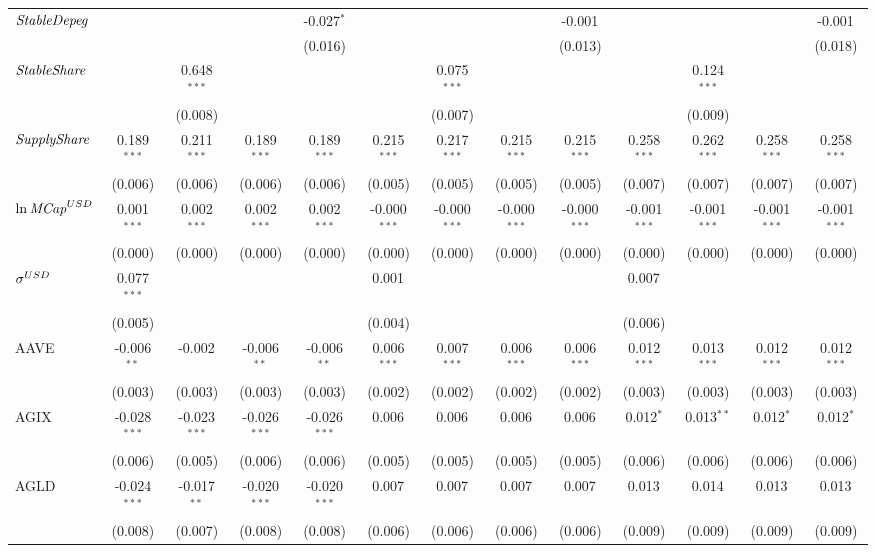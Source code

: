 \begin{table}[!htbp]
\begin{tabular}{@{\extracolsep{5pt}}lcccccccccccc}
 ${\it StableDepeg}$ & & & & -0.027$^{*}$ & & & & -0.001$^{}$ & & & & -0.001$^{}$ \\
  & & & & (0.016) & & & & (0.013) & & & & (0.018) \\
 ${\it StableShare}$ & & 0.648$^{***}$ & & & & 0.075$^{***}$ & & & & 0.124$^{***}$ & & \\
  & & (0.008) & & & & (0.007) & & & & (0.009) & & \\
 ${\it SupplyShare}$ & 0.189$^{***}$ & 0.211$^{***}$ & 0.189$^{***}$ & 0.189$^{***}$ & 0.215$^{***}$ & 0.217$^{***}$ & 0.215$^{***}$ & 0.215$^{***}$ & 0.258$^{***}$ & 0.262$^{***}$ & 0.258$^{***}$ & 0.258$^{***}$ \\
  & (0.006) & (0.006) & (0.006) & (0.006) & (0.005) & (0.005) & (0.005) & (0.005) & (0.007) & (0.007) & (0.007) & (0.007) \\
 ${\it \ln MCap}^{USD}$ & 0.001$^{***}$ & 0.002$^{***}$ & 0.002$^{***}$ & 0.002$^{***}$ & -0.000$^{***}$ & -0.000$^{***}$ & -0.000$^{***}$ & -0.000$^{***}$ & -0.001$^{***}$ & -0.001$^{***}$ & -0.001$^{***}$ & -0.001$^{***}$ \\
  & (0.000) & (0.000) & (0.000) & (0.000) & (0.000) & (0.000) & (0.000) & (0.000) & (0.000) & (0.000) & (0.000) & (0.000) \\
 ${\it \sigma}^{USD}$ & 0.077$^{***}$ & & & & 0.001$^{}$ & & & & 0.007$^{}$ & & & \\
  & (0.005) & & & & (0.004) & & & & (0.006) & & & \\
 AAVE & -0.006$^{**}$ & -0.002$^{}$ & -0.006$^{**}$ & -0.006$^{**}$ & 0.006$^{***}$ & 0.007$^{***}$ & 0.006$^{***}$ & 0.006$^{***}$ & 0.012$^{***}$ & 0.013$^{***}$ & 0.012$^{***}$ & 0.012$^{***}$ \\
  & (0.003) & (0.003) & (0.003) & (0.003) & (0.002) & (0.002) & (0.002) & (0.002) & (0.003) & (0.003) & (0.003) & (0.003) \\
 AGIX & -0.028$^{***}$ & -0.023$^{***}$ & -0.026$^{***}$ & -0.026$^{***}$ & 0.006$^{}$ & 0.006$^{}$ & 0.006$^{}$ & 0.006$^{}$ & 0.012$^{*}$ & 0.013$^{**}$ & 0.012$^{*}$ & 0.012$^{*}$ \\
  & (0.006) & (0.005) & (0.006) & (0.006) & (0.005) & (0.005) & (0.005) & (0.005) & (0.006) & (0.006) & (0.006) & (0.006) \\
 AGLD & -0.024$^{***}$ & -0.017$^{**}$ & -0.020$^{***}$ & -0.020$^{***}$ & 0.007$^{}$ & 0.007$^{}$ & 0.007$^{}$ & 0.007$^{}$ & 0.013$^{}$ & 0.014$^{}$ & 0.013$^{}$ & 0.013$^{}$ \\
  & (0.008) & (0.007) & (0.008) & (0.008) & (0.006) & (0.006) & (0.006) & (0.006) & (0.009) & (0.009) & (0.009) & (0.009) \\

\end{tabular}
\end{table}
